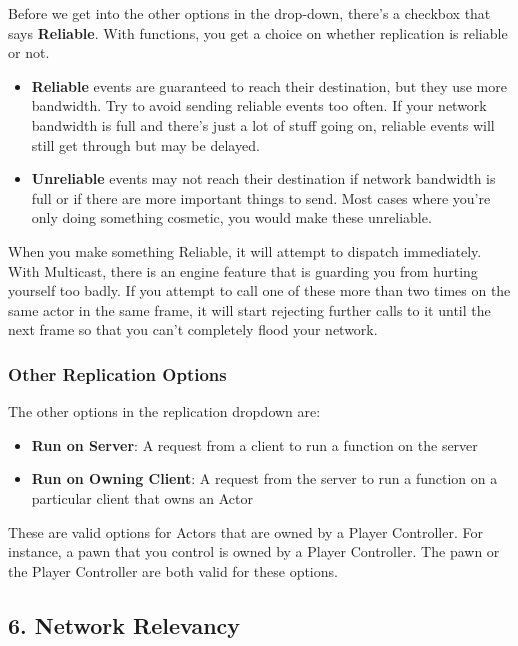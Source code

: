 \documentclass[
  letterpaper,
  DIV=11,
  numbers=noendperiod]{scrartcl}
\providecommand{\tightlist}{%
  \setlength{\itemsep}{0pt}\setlength{\parskip}{0pt}}
\begin{document}
Before we get into the other options in the drop-down, there's a
checkbox that says \textbf{Reliable}. With functions, you get a choice
on whether replication is reliable or not.

\begin{itemize}
\item
  \textbf{Reliable} events are guaranteed to reach their destination,
  but they use more bandwidth. Try to avoid sending reliable events too
  often. If your network bandwidth is full and there's just a lot of
  stuff going on, reliable events will still get through but may be
  delayed.
\item
  \textbf{Unreliable} events may not reach their destination if network
  bandwidth is full or if there are more important things to send. Most
  cases where you're only doing something cosmetic, you would make these
  unreliable.
\end{itemize}

When you make something Reliable, it will attempt to dispatch
immediately. With Multicast, there is an engine feature that is guarding
you from hurting yourself too badly. If you attempt to call one of these
more than two times on the same actor in the same frame, it will start
rejecting further calls to it until the next frame so that you can't
completely flood your network.

\subsubsection{Other Replication
Options}\label{other-replication-options}

The other options in the replication dropdown are:

\begin{itemize}
\tightlist
\item
  \textbf{Run on Server}: A request from a client to run a function on
  the server
\item
  \textbf{Run on Owning Client}: A request from the server to run a
  function on a particular client that owns an Actor
\end{itemize}

These are valid options for Actors that are owned by a Player
Controller. For instance, a pawn that you control is owned by a Player
Controller. The pawn or the Player Controller are both valid for these
options.

\subsection{6. Network Relevancy}\label{network-relevancy}
\end{document}
